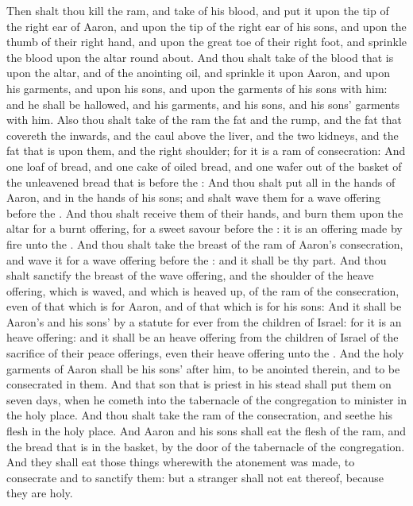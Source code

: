 \begin{biblechapter}
\verse Then shalt thou kill the ram, and take of his blood, and put it upon the tip of the right ear of Aaron, and upon the tip of the right ear of his sons, and upon the thumb of their right hand, and upon the great toe of their right foot, and sprinkle the blood upon the altar round about.
\verse And thou shalt take of the blood that is upon the altar, and of the anointing oil, and sprinkle it upon Aaron, and upon his garments, and upon his sons, and upon the garments of his sons with him: and he shall be hallowed, and his garments, and his sons, and his sons' garments with him.
\verse Also thou shalt take of the ram the fat and the rump, and the fat that covereth the inwards, and the caul above the liver, and the two kidneys, and the fat that is upon them, and the right shoulder; for it is a ram of consecration:
\verse And one loaf of bread, and one cake of oiled bread, and one wafer out of the basket of the unleavened bread that is before the \LORD:
\verse And thou shalt put all in the hands of Aaron, and in the hands of his sons; and shalt wave them for a wave offering before the \LORD.
\verse And thou shalt receive them of their hands, and burn them upon the altar for a burnt offering, for a sweet savour before the \LORD: it is an offering made by fire unto the \LORD.
\verse And thou shalt take the breast of the ram of Aaron's consecration, and wave it for a wave offering before the \LORD: and it shall be thy part.
\verse And thou shalt sanctify the breast of the wave offering, and the shoulder of the heave offering, which is waved, and which is heaved up, of the ram of the consecration, even of that which is for Aaron, and of that which is for his sons:
\verse And it shall be Aaron's and his sons' by a statute for ever from the children of Israel: for it is an heave offering: and it shall be an heave offering from the children of Israel of the sacrifice of their peace offerings, even their heave offering unto the \LORD.
\verse And the holy garments of Aaron shall be his sons' after him, to be anointed therein, and to be consecrated in them.
\verse And that son that is priest in his stead shall put them on seven days, when he cometh into the tabernacle of the congregation to minister in the holy place.
\verse And thou shalt take the ram of the consecration, and seethe his flesh in the holy place.
\verse And Aaron and his sons shall eat the flesh of the ram, and the bread that is in the basket, by the door of the tabernacle of the congregation.
\verse And they shall eat those things wherewith the atonement was made, to consecrate and to sanctify them: but a stranger shall not eat thereof, because they are holy.

\end{biblechapter}
